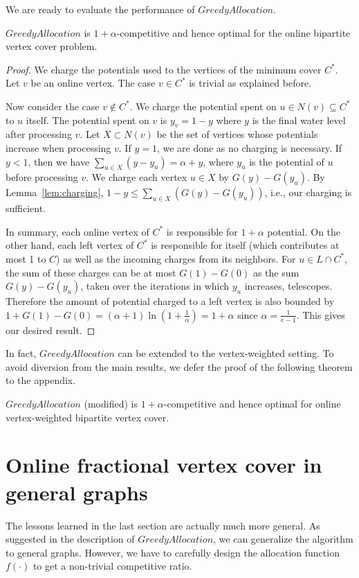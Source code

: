 \documentclass{article}
\begin{document}
We are ready to evaluate the performance of $GreedyAllocation$. 
\begin{theorem}
\label{thm:no alternation}
$GreedyAllocation$ is $1+\alpha$-competitive and hence optimal for the online bipartite vertex cover problem.
\end{theorem}
\begin{proof}
We charge the potentials used to the vertices of the minimum cover $C^*$. Let $v$ be an online vertex. The case $v\in C^*$ is trivial as explained before.



Now consider the case $v\notin C^*$. We charge the potential spent on $u\in N(v)\subseteq C^*$ to $u$ itself. The potential spent on $v$ is $y_v = 1-y$ where $y$ is the final water level after processing $v$. 
Let $X\subset N(v)$ be the set of vertices whose potentials increase when processing $v$.
If $y =1$, we are done as no charging is necessary. If $y <1$, then we have $\sum_{u\in X} (y-y_u) = \alpha +y$, where $y_u$ is the potential of $u$ before processing $v$. We charge each vertex $u\in X$ by $G(y)-G(y_u)$. By Lemma~\ref{lem:charging}, $1-y \leq \sum_{u\in X} (G(y)-G(y_u))$, i.e., our charging is sufficient.



In summary, each online vertex of $C^*$ is responsible for $1+\alpha$ potential. On the other hand, each left vertex of $C^*$ is responsible for itself (which contributes at most 1 to $C$) as well as the incoming charges from its neighbors. For $u\in L\cap C^*$, the sum of these charges can be at most $G(1)-G(0)$ as the sum $G(y)-G(y_u)$, taken over the iterations in which $y_u$ increases, telescopes. Therefore the amount of potential charged to a left vertex is also bounded by $1+G(1)-G(0) = (\alpha+1)\ln (1+\frac{1}{\alpha}) = 1+\alpha$ since $\alpha = \frac{1}{e-1}$.
This gives our desired result.
\end{proof}

In fact, $GreedyAllocation$ can be extended to the vertex-weighted setting. To avoid diversion from the main results, we defer the proof of the following theorem to the appendix.
\begin{theorem}
$GreedyAllocation$ (modified) is $1+\alpha$-competitive and hence optimal for online vertex-weighted bipartite vertex cover.
\end{theorem}


\section{Online fractional vertex cover in general graphs}
The lessons learned in the last section are actually much more general. As suggested in the description of $GreedyAllocation$, we can generalize the algorithm to general graphs. However, we have to carefully design the allocation function $f(\cdot)$ to get a non-trivial competitive ratio.
\end{document}

